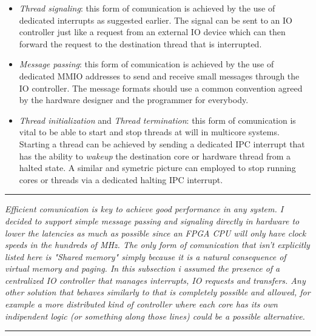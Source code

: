 \documentclass{article}
\begin{document}
            \begin{itemize}

                \item \textit{Thread signaling}: this form of comunication is achieved by the use of dedicated interrupts as suggested earlier. The signal can be sent to an IO controller just like a request from an external IO device which can then forward the request to the destination thread that is interrupted.
                \item \textit{Message passing}: this form of comunication is achieved by the use of dedicated MMIO addresses to send and receive small messages through the IO controller. The message formats should use a common convention agreed by the hardware designer and the programmer for everybody.
                \item \textit{Thread initialization} and \textit{Thread termination}: this form of comunication is vital to be able to start and stop threads at will in multicore systems. Starting a thread can be achieved by sending a dedicated IPC interrupt that has the ability to \textit{wakeup} the destination core or hardware thread from a halted state. A similar and symetric picture can employed to stop running cores or threads via a dedicated halting IPC interrupt.

            \end{itemize}

        \par\noindent\rule{\textwidth}{0.4pt}
        \textit{Efficient comunication is key to achieve good performance in any system. I decided to support simple message passing and signaling directly in hardware to lower the latencies as much as possible since an FPGA CPU will only have clock speeds in the hundreds of MHz. The only form of comunication that isn't explicitly listed here is "Shared memory" simply because it is a natural consequence of virtual memory and paging. In this subsection i assumed the presence of a centralized IO controller that manages interrupts, IO requests and transfers. Any other solution that behaves similarly to that is completely possible and allowed, for example a more distributed kind of controller where each core has its own indipendent logic (or something along those lines) could be a possible alternative.}
        \par\noindent\rule{\textwidth}{0.4pt}

    \clearpage
\end{document}
